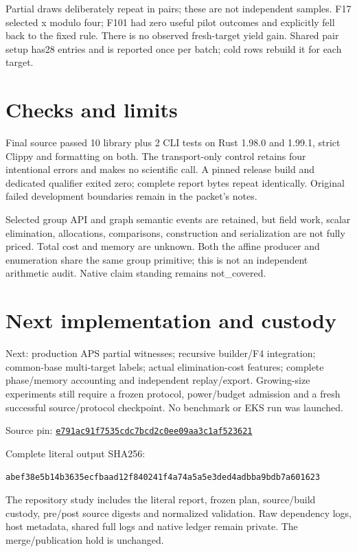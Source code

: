 \documentclass[10pt]{article}
\begin{document}
Partial draws deliberately repeat in pairs; these are not independent samples.
F17 selected x modulo four; F101 had zero useful pilot outcomes and explicitly
fell back to the fixed rule. There is no observed fresh-target yield gain.
Shared pair setup has28 entries and is reported once per batch; cold rows
rebuild it for each target.

\section*{Checks and limits}
Final source passed 10 library plus 2 CLI tests on Rust 1.98.0 and 1.99.1, strict
Clippy and formatting on both. The transport-only control retains four
intentional errors and makes no scientific call. A pinned release build and
dedicated qualifier exited zero; complete report bytes repeat identically.
Original failed development boundaries remain in the packet's notes.

Selected group API and graph semantic events are retained, but field work,
scalar elimination, allocations, comparisons, construction and serialization
are not fully priced. Total cost and memory are unknown. Both the affine
producer and enumeration share the same group primitive; this is not an
independent arithmetic audit. Native claim standing remains not\_covered.

\section*{Next implementation and custody}
Next: production APS partial witnesses; recursive builder/F4 integration;
common-base multi-target labels; actual elimination-cost features; complete
phase/memory accounting and independent replay/export. Growing-size experiments
still require a frozen protocol, power/budget admission and a fresh successful
source/protocol checkpoint. No benchmark or EKS run was launched.

\noindent Source pin:
\href{https://github.com/isogeny-labs/crypto/commit/e791ac91f7535cdc7bcd2c0ee09aa3c1af523621}{\texttt{e791ac91f7535cdc7bcd2c0ee09aa3c1af523621}}\par
\noindent Complete literal output SHA256:\par
\texttt{abef38e5b14b3635ecfbaad12f840241f4a74a5a5e3ded4adbba9bdb7a601623}\par
\noindent The repository study includes the literal report, frozen plan,
source/build custody, pre/post source digests and normalized validation.
Raw dependency logs, host metadata, shared full logs and native ledger remain
private. The merge/publication hold is unchanged.
\end{document}
